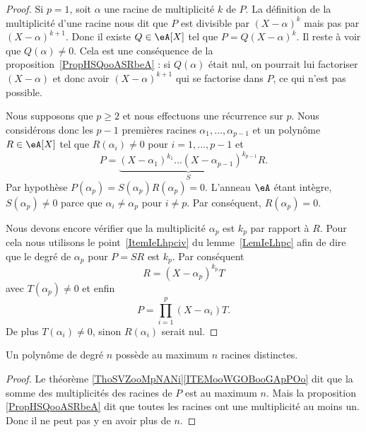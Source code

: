 \begin{proof}
    Si \( p=1\), soit \( \alpha\) une racine de multiplicité \( k\) de \( P\). La définition de la multiplicité d'une racine nous dit que \( P\) est divisible par \( (X-\alpha)^k\) mais pas par \( (X-\alpha)^{k+1}\). Donc il existe \( Q\in \eA[X]\) tel que \( P=Q(X-\alpha)^k\). Il reste à voir que \( Q(\alpha)\neq 0\). Cela est une conséquence de la proposition~\ref{PropHSQooASRbeA} : si \( Q(\alpha)\) était nul, on pourrait lui factoriser \( (X-\alpha)\) et donc avoir \( (X-\alpha)^{k+1}\) qui se factorise dans \( P\), ce qui n'est pas possible.

    Nous supposons que \( p\geq 2\) et nous effectuons une récurrence sur \( p\). Nous considérons donc les \( p-1\) premières racines \( \alpha_1,\ldots, \alpha_{p-1}\) et un polynôme \( R\in\eA[X]\) tel que \( R(\alpha_i)\neq 0\) pour \( i=1,\ldots, p-1\) et
    \begin{equation}
        P=\underbrace{(X-\alpha_1)^{k_1}\ldots (X-\alpha_{p-1})^{k_{p-1}}}_SR.
    \end{equation}
    Par hypothèse \( P(\alpha_p)=S(\alpha_p)R(\alpha_p)=0\). L'anneau \( \eA\) étant intègre, \( S(\alpha_p)\neq 0\) parce que \( \alpha_i\neq \alpha_p\) pour \( i\neq p\). Par conséquent, \( R(\alpha_p)=0\).

    Nous devons encore vérifier que la multiplicité \( \alpha_p\) est \( k_p\) par rapport à \( R\). Pour cela nous utilisons le point~\ref{ItemIeLhpciv} du lemme~\ref{LemIeLhpc} afin de dire que le degré de \( \alpha_p\) pour \( P=SR\) est \( k_p\). Par conséquent
    \begin{equation}
        R=(X-\alpha_p)^{k_p}T
    \end{equation}
    avec \( T(\alpha_p)\neq 0\) et enfin
    \begin{equation}
        P=\prod_{i=1}^p(X-\alpha_i)T.
    \end{equation}
    De plus \( T(\alpha_i)\neq 0\), sinon \( R(\alpha_i)\) serait nul.
\end{proof}

\begin{corollary}       \label{CORooUGJGooBofWLr}
    Un polynôme de degré \( n\) possède au maximum \( n\) racines distinctes.
\end{corollary}

\begin{proof}
    Le théorème \ref{ThoSVZooMpNANi}\ref{ITEMooWGOBooGApPOo} dit que la somme des multiplicités des racines de \( P\) est au maximum \( n\). Mais la proposition \ref{PropHSQooASRbeA} dit que toutes les racines ont une multiplicité au moins un. Donc il ne peut pas y en avoir plus de \( n\).
\end{proof}

